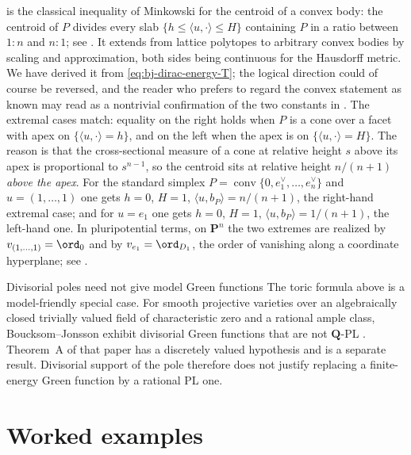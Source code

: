 \begin{remark}
\label{rem:ch49-minkowski-check}
 is the classical inequality of Minkowski for the
centroid of a convex body: the centroid of $P$ divides every slab
$\{h\le\langle u,\cdot\rangle\le H\}$ containing $P$ in a ratio between
$1:n$ and $n:1$; see \cite{Sch14}.  It extends from lattice polytopes to
arbitrary convex bodies by scaling and approximation, both sides being
continuous for the Hausdorff metric.  We have derived it from
\eqref{eq:bj-dirac-energy-T}; the logical direction could of course be
reversed, and the reader who prefers to regard the convex statement as
known may read  as a nontrivial confirmation of
the two constants in .  The extremal cases
match: equality on the right holds when $P$ is a cone over a facet with
apex on $\{ \langle u,\cdot\rangle=h\}$, and on the left when the apex is
on $\{\langle u,\cdot\rangle=H\}$.  The reason is that the
cross-sectional measure of a cone at relative height $s$ above its apex
is proportional to $s^{n-1}$, so the centroid sits at relative height
$n/(n+1)$ \emph{above the apex}.  For the standard simplex
$P=\operatorname{conv}\{0,e_1^\vee,\dots,e_n^\vee\}$ and
$u=(1,\dots,1)$ one gets $h=0$, $H=1$,
$\langle u,b_P\rangle=n/(n+1)$, the right-hand extremal case; and for
$u=e_1$ one gets $h=0$, $H=1$,
$\langle u,b_P\rangle=1/(n+1)$, the left-hand one.  In pluripotential
terms, on $\mathbf P^n$ the two extremes are realized by
$v_{(1,\dots,1)}=\ord_0$ and by $v_{e_1}=\ord_{D_1}$, the order of
vanishing along a coordinate hyperplane; see
.
\end{remark}

\begin{warning}{Divisorial poles need not give model Green functions}
\label{warn:ch49-green-not-pl}
The toric formula above is a model-friendly special case.
For smooth projective varieties over an algebraically closed trivially
valued field of characteristic zero and a rational ample class,
Boucksom--Jonsson exhibit divisorial Green functions that are not $\mathbf Q$-PL
\cite[Theorem~60 and Examples~63, 65]{BJGreen24}.
Theorem~A of that paper has a discretely valued hypothesis and is
a separate result.  Divisorial support of the pole therefore
does not justify replacing a finite-energy Green function by a rational PL
one.
\end{warning}

\section{Worked examples}
\label{sec:ch49-examples}

